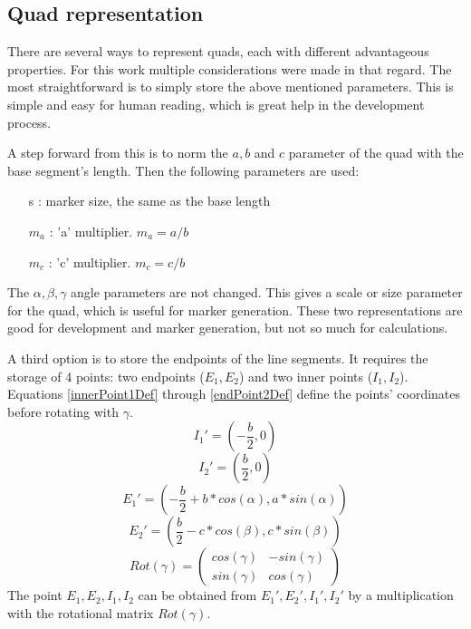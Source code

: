 \subsection{Quad representation}

There are several ways to represent quads, each with different advantageous properties.
For this work multiple considerations were made in that regard.
The most straightforward is to simply store the above mentioned parameters.
This is simple and easy for human reading, which is great help in the development process.

A step forward from this is to norm the $a,b$ and $c$ parameter of the quad with the base segment's length.
Then the following parameters are used:
\begin{itemize}
	\item[s]: marker size, the same as the base length
	\item[$m_a$]: 'a' multiplier. $m_a = a/b$
	\item[$m_c$]: 'c' multiplier. $m_c = c/b$
\end{itemize}
The $\alpha,\beta,\gamma$ angle parameters are not changed.
This gives a scale or size parameter for the quad, which is useful for marker generation.
These two representations are good for development and marker generation, but not so much for calculations.

A third option is to store the endpoints of the line segments.
It requires the storage of 4 points: two endpoints ($E_1,E_2$) and two inner points ($I_1,I_2$).
Equations \eqref{innerPoint1Def} through \eqref{endPoint2Def} define the points' coordinates before rotating with $\gamma$.
\begin{equation}
	\label{eq:innerPoint1Def}
	I_1' = (-\frac{b}{2}, 0)
\end{equation}
\begin{equation}
	\label{eq:innerPoint2Def}
	I_2' = (\frac{b}{2}, 0)
\end{equation}
\begin{equation}
	\label{eq:endPoint1Def}
	E_1' = (-\frac{b}{2} + b*cos(\alpha),a*sin(\alpha))
\end{equation}
\begin{equation}
	\label{eq:endPoint2Def}
	E_2' = (\frac{b}{2} - c*cos(\beta),c*sin(\beta))
\end{equation}
\begin{equation}
	\label{eq:rotMatrix}
	Rot(\gamma) = \left( \begin{array}{cc}
	cos(\gamma) & -sin(\gamma)  \\
	sin(\gamma) & cos(\gamma)  \end{array} \right)
\end{equation}
The point $E_1,E_2,I_1,I_2$ can be obtained from $E_1',E_2',I_1',I_2'$ by a multiplication with the rotational matrix $Rot(\gamma)$.

